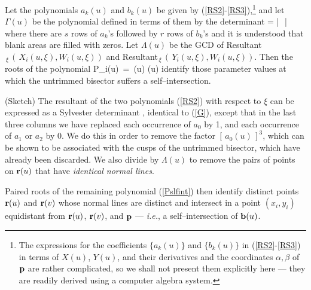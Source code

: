 \begin{propn}
Let the polynomials $a_k(u)$ and $b_k(u)$ be given 
by {\rm (\ref{RS2}-\ref{RS3})},\footnote{The expressions for the coefficients 
	$\{a_k(u)\}$ and $\{b_k(u)\}$ in
	(\ref{RS2}-\ref{RS3}) in terms of $X(u)$, $Y(u)$, 
	and their derivatives and the
	coordinates $\alpha,\beta$ of ${\bf p}$ are rather complicated, so we
	shall not present them explicitly here --- they are readily derived
	using a computer algebra system.}
and let $\Gamma(u)$ be the polynomial defined in terms of them by the
determinant
\be \label{G}
\Gamma \;=\; \left|\,  \,\right| \,
\ee
where there are $s$ rows of $a_k\!$'s followed by $r$ rows of $b_k\!$'s
and it is understood that blank areas are filled with zeros. 
Let $\Lambda(u)$ be the GCD of 
Resultant$_{\,\xi}\,(\,X_i(u,\xi),W_i(u,\xi))$
and Resultant$_{\,\xi}\,(\,Y_i(u,\xi),W_i(u,\xi))$.
Then the roots of the polynomial
\be \label{Pslfint}
P_i(u) \,=\, {\Gamma(u) \over \Lambda(u)}
\ee
identify those parameter values
at which the untrimmed bisector suffers a self--intersection.
\end{propn}
\ifFull
\prf
(Sketch)
The resultant of the two polynomials (\ref{RS2}) with respect to $\xi$
can be expressed as a Sylvester determinant \cite{uspensky48}, identical
to (\ref{G}), except that in the last three columns we have replaced
each occurrence of $a_0$ by 1, and each occurrence of $a_1$ or $a_2$ by
0. 
We do this in order to remove the factor $[\,a_0(u)\,]^3$, which can be
shown to be associated with the cusps of the untrimmed bisector, which
have already been discarded.
We also divide by  $\Lambda(u)$ to remove the 
pairs of points on ${\bf r}(u)$ that have {\it
identical normal lines\/}.

Paired roots of the remaining polynomial (\ref{Pslfint}) then identify
distinct points ${\bf r}(u)$ and ${\bf r}(v)$ whose normal lines are
distinct and intersect in a point $(x_i,y_i)$ equidistant from ${\bf r}
(u)$, ${\bf r}(v)$, and ${\bf p}$ --- {\it i.e.}, a self--intersection
of ${\bf b}(u)$. \QED
\fi

